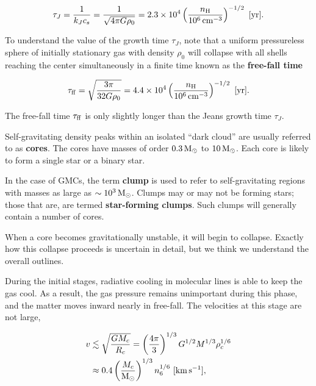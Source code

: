 \documentclass[a4paper,10pt]{article}
\begin{document}
\begin{align*}
    \tau_J = \frac{1}{k_Jc_s} = \frac{1}{\sqrt{4\pi G\rho_0}} = 2.3\times10^4 \left(\frac{n_{\rm H}}{10^6\,{\rm cm^{-3}}}\right)^{-1/2} ~ [{\rm yr}].
\end{align*}

{\noindent}To understand the value of the growth time $\tau_J$, note that a uniform pressureless sphere of initially stationary gas with density $\rho_0$ will collapse with all shells reaching the center simultaneously in a finite time known as the \textbf{free-fall time}

\begin{align*}
    \tau_{\rm ff} = \sqrt{\frac{3\pi}{32G\rho_0}} = 4.4\times10^4 \left(\frac{n_{\rm H}}{10^6\,{\rm cm^{-3}}}\right)^{-1/2} ~ [{\rm yr}].
\end{align*}

{\noindent}The free-fall time $\tau_{\rm ff}$ is only slightly longer than the Jeans growth time $\tau_J$.

{\noindent}Self-gravitating density peaks within an isolated ``dark cloud'' are usually referred to as \textbf{cores}. The cores have masses of order $0.3\,{\rm M_\odot}$ to $10\,{\rm M_\odot}$. Each core is likely to form a single star or a binary star.

{\noindent}In the case of GMCs, the term \textbf{clump} is used to refer to self-gravitating regions with masses as large as $\sim10^3\,{\rm M_\odot}$. Clumps may or may not be forming stars; those that are, are termed \textbf{star-forming clumps}. Such clumps will generally contain a number of cores.

{\noindent}When a core becomes gravitationally unstable, it will begin to collapse. Exactly how this collapse proceeds is uncertain in detail, but we think we understand the overall outlines.

{\noindent}During the initial stages, radiative cooling in molecular lines is able to keep the gas cool. As a result, the gas pressure remains unimportant during this phase, and the matter moves inward nearly in free-fall. The velocities at this stage are not large,

\begin{align*}
    v &\lesssim \sqrt{\frac{GM_c}{R_c}} = \left(\frac{4\pi}{3}\right)^{1/3} G^{1/2} M^{1/3} \rho_c^{1/6} \\
    &\approx 0.4 \left(\frac{M_c}{{\rm M_\odot}}\right)^{1/3} n_6^{1/6} ~ [{\rm km\,s^{-1}}],
\end{align*}
\end{document}
